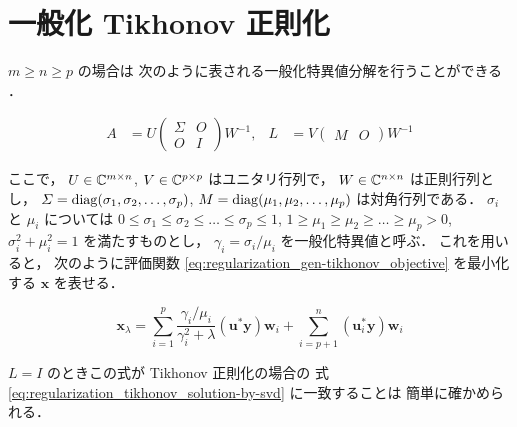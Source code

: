 \section{一般化 Tikhonov 正則化}

$m \ge n \ge p$ の場合は
次のように表される一般化特異値分解を行うことができる \cite{Hansen1998}．

\begin{align}
    A       & =U
    \begin{pmatrix}
        \Sigma & O \\
        O      & I
    \end{pmatrix}
    W^{-1}, &
    L       & =V
    \begin{pmatrix}
        M & O
    \end{pmatrix}
    W^{-1}
\end{align}

ここで，
$U \in \mathbb{C}^{m \times n}$,
$V \in \mathbb{C}^{p \times p}$
はユニタリ行列で，
$W \in \mathbb{C}^{n \times n}$
は正則行列とし，
$\varSigma = \operatorname{diag}(\sigma_1, \sigma_2, \ldots, \sigma_p)$,
$M = \operatorname{diag}(\mu_1, \mu_2, \ldots, \mu_p)$
は対角行列である．
$\sigma_i$ と $\mu_i$ については
$0 \le \sigma_1 \le \sigma_2 \le \ldots \le \sigma_p \le 1$,
$1 \ge \mu_1 \ge \mu_2 \ge \ldots \ge \mu_p > 0$,
$\sigma_i^2 + \mu_i^2 = 1$
を満たすものとし，
$\gamma_i = \sigma_i / \mu_i$
を一般化特異値と呼ぶ．
これを用いると，
次のように評価関数 \eqref{eq:regularization_gen-tikhonov_objective} を最小化する
$\bm{x}$ を表せる\cite{Hansen1998}．

\begin{equation}
    \bm{x}_\lambda =
    \sum_{i=1}^{p} \frac{\gamma_i / \mu_i}{\gamma_i^2+\lambda}
    (\bm{u}^*\bm{y}) \bm{w}_i
    +\sum_{i=p+1}^n (\bm{u}_i^*\bm{y}) \bm{w}_i
\end{equation}

$L=I$ のときこの式が Tikhonov 正則化の場合の
式 \eqref{eq:regularization_tikhonov_solution-by-svd} に一致することは
簡単に確かめられる．
